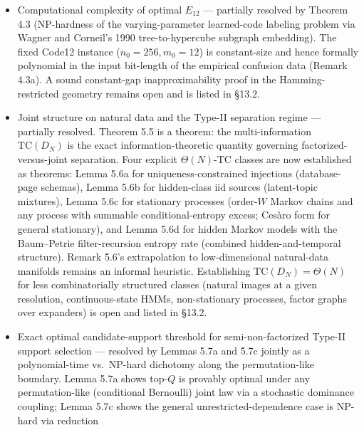 \documentclass[
]{article}
\begin{document}
\begin{itemize}
  Type-II is order-optimal in general and entropy-optimal in the
  uniform-candidate-set regime; the flat-indexing overhead is the price of
  uniform enumeration on the candidate set, not a property of Type-II or
  even of the count-plus-rank decomposition. This is distinct from Lemma
  5.1e, which converses sequential sub-block random access, not the
  partition representation.
\item
  Computational complexity of optimal $E_{12}$ --- partially
  resolved by Theorem 4.3 (NP-hardness of the varying-parameter
  learned-code labeling problem via Wagner and Corneil's 1990
  tree-to-hypercube subgraph embedding). The fixed Code12 instance
  ($n_0 = 256, m_0 = 12$) is constant-size and hence formally
  polynomial in the input bit-length of the empirical confusion data
  (Remark 4.3a). A sound constant-gap inapproximability proof in
  the Hamming-restricted geometry remains open and is listed in
  §13.2.
\item
  Joint structure on natural data and the Type-II separation regime
  --- partially resolved. Theorem 5.5 is a theorem: the
  multi-information $\mathrm{TC}(D_N)$ is the exact
  information-theoretic quantity governing factorized-versus-joint
  separation. Four explicit $\Theta(N)$-TC classes are now
  established as theorems: Lemma 5.6a for uniqueness-constrained
  injections (database-page schemas), Lemma 5.6b for hidden-class
  iid sources (latent-topic mixtures), Lemma 5.6c for stationary
  processes (order-$W$ Markov chains and any process with summable
  conditional-entropy excess; Ces\`aro form for general stationary),
  and Lemma 5.6d for hidden Markov models with the Baum--Petrie
  filter-recursion entropy rate (combined hidden-and-temporal
  structure). Remark 5.6's extrapolation to low-dimensional
  natural-data manifolds remains an informal heuristic. Establishing
  $\mathrm{TC}(D_N) = \Theta(N)$ for less combinatorially structured
  classes (natural images at a given resolution, continuous-state
  HMMs, non-stationary processes, factor graphs over expanders) is
  open and listed in §13.2.
\item
  Exact optimal candidate-support threshold for semi-non-factorized
  Type-II support selection --- resolved by Lemmas 5.7a and 5.7c
  jointly as a polynomial-time vs.\ NP-hard dichotomy along the
  permutation-like boundary. Lemma 5.7a shows top-$Q$ is provably
  optimal under any permutation-like (conditional Bernoulli) joint
  law via a stochastic dominance coupling; Lemma 5.7c shows the
  general unrestricted-dependence case is NP-hard via reduction

\end{itemize}
\end{document}
